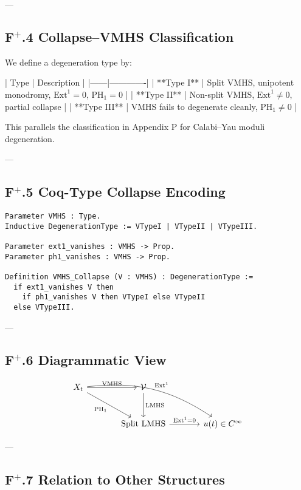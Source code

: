 \documentclass[11pt]{article}
\begin{document}
---

\subsection*{F$^+$.4 Collapse–VMHS Classification}

We define a degeneration type by:

| Type | Description |
|------|-------------|
| **Type I** | Split VMHS, unipotent monodromy, \( \mathrm{Ext}^1 = 0 \), \( \mathrm{PH}_1 = 0 \) |
| **Type II** | Non-split VMHS, \( \mathrm{Ext}^1 \neq 0 \), partial collapse |
| **Type III** | VMHS fails to degenerate cleanly, \( \mathrm{PH}_1 \neq 0 \) |

This parallels the classification in Appendix P for Calabi–Yau moduli degeneration.

---

\subsection*{F$^+$.5 Coq-Type Collapse Encoding}

\begin{lstlisting}[language=Coq]
Parameter VMHS : Type.
Inductive DegenerationType := VTypeI | VTypeII | VTypeIII.

Parameter ext1_vanishes : VMHS -> Prop.
Parameter ph1_vanishes : VMHS -> Prop.

Definition VMHS_Collapse (V : VMHS) : DegenerationType :=
  if ext1_vanishes V then
    if ph1_vanishes V then VTypeI else VTypeII
  else VTypeIII.
\end{lstlisting}

---

\subsection*{F$^+$.6 Diagrammatic View}

\[
\begin{tikzcd}[row sep=large, column sep=large]
X_t \arrow[r, "\text{VMHS}"] \arrow[dr, "\mathrm{PH}_1"'] \arrow[drr, bend left=20, "\mathrm{Ext}^1"] &
\mathcal{V} \arrow[d, "\text{LMHS}"] \\
& \text{Split LMHS} \arrow[r, "\mathrm{Ext}^1 = 0"] &
u(t) \in C^\infty
\end{tikzcd}
\]

---

\subsection*{F$^+$.7 Relation to Other Structures}
\end{document}
